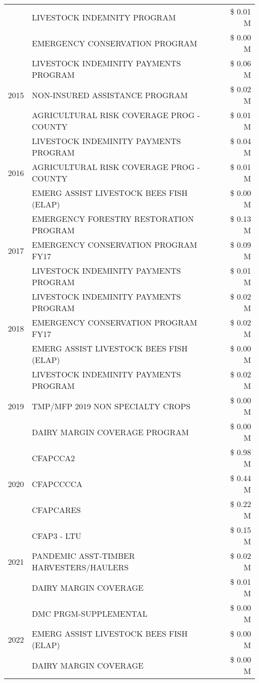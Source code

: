 \begin{tabular}{llr}
 & LIVESTOCK INDEMNITY PROGRAM & \$ 0.01 M \\
 & EMERGENCY CONSERVATION PROGRAM & \$ 0.00 M \\
\cline{1-3}
\multirow[t]{3}{*}{2015} & LIVESTOCK INDEMINITY PAYMENTS PROGRAM & \$ 0.06 M \\
 & NON-INSURED ASSISTANCE PROGRAM & \$ 0.02 M \\
 & AGRICULTURAL RISK COVERAGE PROG - COUNTY & \$ 0.01 M \\
\cline{1-3}
\multirow[t]{3}{*}{2016} & LIVESTOCK INDEMINITY PAYMENTS PROGRAM & \$ 0.04 M \\
 & AGRICULTURAL RISK COVERAGE PROG - COUNTY & \$ 0.01 M \\
 & EMERG ASSIST LIVESTOCK BEES FISH (ELAP) & \$ 0.00 M \\
\cline{1-3}
\multirow[t]{3}{*}{2017} & EMERGENCY FORESTRY RESTORATION PROGRAM & \$ 0.13 M \\
 & EMERGENCY CONSERVATION PROGRAM FY17 & \$ 0.09 M \\
 & LIVESTOCK INDEMINITY PAYMENTS PROGRAM & \$ 0.01 M \\
\cline{1-3}
\multirow[t]{3}{*}{2018} & LIVESTOCK INDEMINITY PAYMENTS PROGRAM & \$ 0.02 M \\
 & EMERGENCY CONSERVATION PROGRAM FY17 & \$ 0.02 M \\
 & EMERG ASSIST LIVESTOCK BEES FISH (ELAP) & \$ 0.00 M \\
\cline{1-3}
\multirow[t]{3}{*}{2019} & LIVESTOCK INDEMINITY PAYMENTS PROGRAM & \$ 0.02 M \\
 & TMP/MFP 2019 NON SPECIALTY CROPS & \$ 0.00 M \\
 & DAIRY MARGIN COVERAGE PROGRAM & \$ 0.00 M \\
\cline{1-3}
\multirow[t]{3}{*}{2020} & CFAPCCA2 & \$ 0.98 M \\
 & CFAPCCCCA & \$ 0.44 M \\
 & CFAPCARES & \$ 0.22 M \\
\cline{1-3}
\multirow[t]{3}{*}{2021} & CFAP3 - LTU & \$ 0.15 M \\
 & PANDEMIC ASST-TIMBER HARVESTERS/HAULERS & \$ 0.02 M \\
 & DAIRY MARGIN COVERAGE & \$ 0.01 M \\
\cline{1-3}
\multirow[t]{3}{*}{2022} & DMC PRGM-SUPPLEMENTAL & \$ 0.00 M \\
 & EMERG ASSIST LIVESTOCK BEES FISH (ELAP) & \$ 0.00 M \\
 & DAIRY MARGIN COVERAGE & \$ 0.00 M \\
\cline{1-3}
\bottomrule
\end{tabular}
